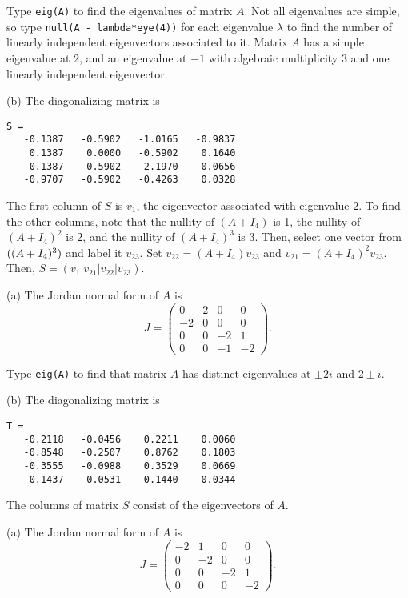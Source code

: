 \soln Type {\tt eig(A)} to find the eigenvalues of matrix $A$.  Not all
eigenvalues are simple, so type {\tt null(A - lambda*eye(4))} for each
eigenvalue $\lambda$ to find the number of linearly independent eigenvectors
associated to it.  Matrix $A$ has a simple eigenvalue at $2$, and
an eigenvalue at $-1$ with algebraic multiplicity 3 and one linearly
independent eigenvector.

(b) \ans   The diagonalizing matrix is
\begin{verbatim}
S =
   -0.1387   -0.5902   -1.0165   -0.9837
    0.1387    0.0000   -0.5902    0.1640
    0.1387    0.5902    2.1970    0.0656
   -0.9707   -0.5902   -0.4263    0.0328
\end{verbatim}

\soln The first column of $S$ is $v_1$, the eigenvector associated with
eigenvalue $2$.  To find the other columns, note that the nullity of
$(A + I_4)$ is 1, the nullity of $(A + I_4)^2$ is 2, and the nullity of
$(A + I_4)^3$ is 3.  Then, select one vector from $\null((A + I_4)^3)$
and label it $v_{23}$.  Set $v_{22} = (A + I_4)v_{23}$ and
$v_{21} = (A + I_4)^2v_{23}$.  Then, $S = (v_1|v_{21}|v_{22}|v_{23})$.

(a) \ans The Jordan normal form of $A$ is
\[
J = \left(\begin{array}{rrrr}
 0 & 2 &  0 &  0 \\
-2 & 0 &  0 &  0 \\
 0 & 0 & -2 &  1 \\
 0 & 0 & -1 & -2 \end{array}\right).
\]

\soln Type {\tt eig(A)} to find that matrix $A$ has distinct eigenvalues
at $\pm 2i$ and $2 \pm i$.

(b) \ans   The diagonalizing matrix is
\begin{verbatim}
T =
   -0.2118   -0.0456    0.2211    0.0060
   -0.8548   -0.2507    0.8762    0.1803
   -0.3555   -0.0988    0.3529    0.0669
   -0.1437   -0.0531    0.1440    0.0344
\end{verbatim}

\soln The columns of matrix $S$ consist of the eigenvectors of $A$.


(a) \ans The Jordan normal form of $A$ is
\[
J = \left(\begin{array}{rrrr}
-2 & 1 & 0 & 0 \\
0 & -2 & 0 & 0 \\
0 & 0 & -2 & 1 \\
0 & 0 & 0 & -2 \end{array}\right).
\]


